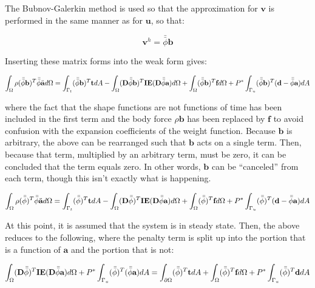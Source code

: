 \documentclass[10pt]{article}
\begin{document}
The Bubnov-Galerkin method is used so that the approximation for \(\textbf{v}\) is performed in the same manner as for \(\textbf{u}\), so that:

\begin{equation}
\textbf{v}^h=\bar{\bar{\phi}}\textbf{b}
\end{equation}

Inserting these matrix forms into the weak form gives:

\begin{equation}
\int_{\Omega}\rho(\bar{\bar{\phi}}\textbf{b})^T\bar{\bar{\phi}}\ddot{\textbf{a}}d\Omega=\int_{\Gamma_t}(\bar{\bar{\phi}}\textbf{b})^T\textbf{t}dA- \int_{\Omega}(\textbf{D}\bar{\bar{\phi}}\textbf{b})^T\textbf{IE}(\textbf{D}\bar{\bar{\phi}}\textbf{a})d\Omega +\int_{\Omega}(\bar{\bar{\phi}}\textbf{b})^T\textbf{f}d\Omega+P^{*}\int_{\Gamma_u}(\bar{\bar{\phi}}\textbf{b})^T(\textbf{d}-\bar{\bar{\phi}}\textbf{a})dA\\
\end{equation}

where the fact that the shape functions are not functions of time has been included in the first term and the body force \(\rho\textbf{b}\) has been replaced by \(\textbf{f}\) to avoid confusion with the expansion coefficients of the weight function. Because \(\textbf{b}\) is arbitrary, the above can be rearranged such that \(\textbf{b}\) acts on a single term. Then, because that term, multiplied by an arbitrary term, must be zero, it can be concluded that the term equals zero. In other words, \(\textbf{b}\) can be ``canceled'' from each term, though this isn't exactly what is happening.

\begin{equation}
\int_{\Omega}\rho(\bar{\bar{\phi}})^T\bar{\bar{\phi}}\ddot{\textbf{a}}d\Omega=\int_{\Gamma_t}(\bar{\bar{\phi}})^T\textbf{t}dA- \int_{\Omega}(\textbf{D}\bar{\bar{\phi}})^T\textbf{IE}(\textbf{D}\bar{\bar{\phi}}\textbf{a})d\Omega +\int_{\Omega}(\bar{\bar{\phi}})^T\textbf{f}d\Omega+P^{*}\int_{\Gamma_u}(\bar{\bar{\phi}})^T(\textbf{d}-\bar{\bar{\phi}}\textbf{a})dA\\
\end{equation}

At this point, it is assumed that the system is in steady state. Then, the above reduces to the following, where the penalty term is split up into the portion that is a function of \(\textbf{a}\) and the portion that is not:

\begin{equation}
\int_{\Omega}(\textbf{D}\bar{\bar{\phi}})^T\textbf{IE}(\textbf{D}\bar{\bar{\phi}}\textbf{a})d\Omega +P^{*}\int_{\Gamma_u}(\bar{\bar{\phi}})^T(\bar{\bar{\phi}}\textbf{a})dA=\int_{\partial\Omega}(\bar{\bar{\phi}})^T\textbf{t}dA+\int_{\Omega}(\bar{\bar{\phi}})^T\textbf{f}d\Omega+P^{*}\int_{\Gamma_u}(\bar{\bar{\phi}})^T\textbf{d}dA\\
\end{equation}
\end{document}
